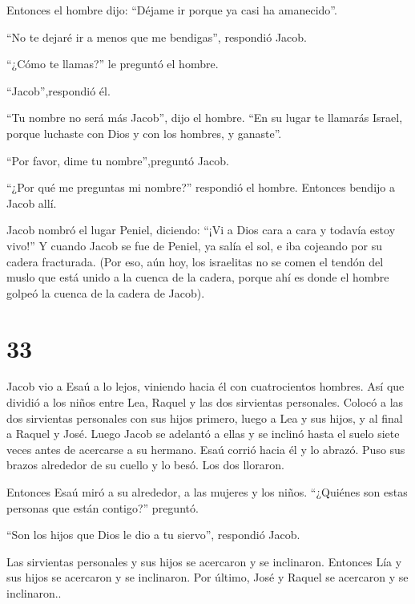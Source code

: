  Entonces el hombre dijo: ``Déjame ir porque ya casi ha
amanecido''.

``No te dejaré ir a menos que me bendigas'', respondió Jacob.

 ``¿Cómo te llamas?'' le preguntó el hombre.

``Jacob'',respondió él.

 ``Tu nombre no será más Jacob'', dijo el hombre. ``En su
lugar te llamarás Israel, porque luchaste con Dios y con los hombres, y
ganaste''.

 ``Por favor, dime tu nombre'',preguntó Jacob.

``¿Por qué me preguntas mi nombre?'' respondió el hombre. Entonces
bendijo a Jacob allí.

 Jacob nombró el lugar Peniel, diciendo: ``¡Vi a Dios cara
a cara y todavía estoy vivo!''  Y cuando Jacob se fue de
Peniel, ya salía el sol, e iba cojeando por su cadera fracturada.
 (Por eso, aún hoy, los israelitas no se comen el tendón
del muslo que está unido a la cuenca de la cadera, porque ahí es donde
el hombre golpeó la cuenca de la cadera de Jacob).

\hypertarget{section-32}{%
\section{33}\label{section-32}}

 Jacob vio a Esaú a lo lejos, viniendo hacia él con
cuatrocientos hombres. Así que dividió a los niños entre Lea, Raquel y
las dos sirvientas personales.  Colocó a las dos sirvientas
personales con sus hijos primero, luego a Lea y sus hijos, y al final a
Raquel y José.  Luego Jacob se adelantó a ellas y se inclinó
hasta el suelo siete veces antes de acercarse a su hermano. 
Esaú corrió hacia él y lo abrazó. Puso sus brazos alrededor de su cuello
y lo besó. Los dos lloraron.

 Entonces Esaú miró a su alrededor, a las mujeres y los
niños. ``¿Quiénes son estas personas que están contigo?'' preguntó.

``Son los hijos que Dios le dio a tu siervo'', respondió Jacob.

 Las sirvientas personales y sus hijos se acercaron y se
inclinaron.  Entonces Lía y sus hijos se acercaron y se
inclinaron. Por último, José y Raquel se acercaron y se inclinaron..

